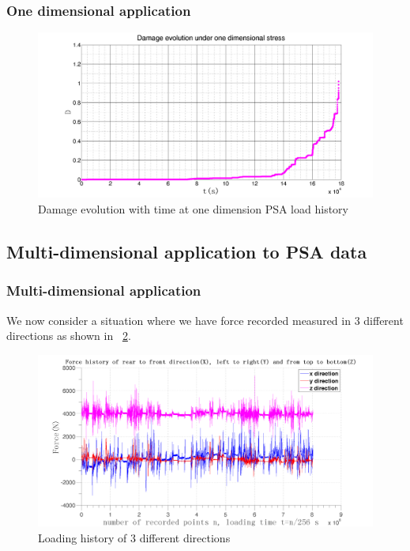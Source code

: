 \documentclass[xcolor=table]{Bredelebeamer}
\newcommand{\figref}[1]{\figurename~\ref{#1}}
\begin{document}
\begin{frame}
	\frametitle{One dimensional application}
\begin{figure}[!h]
	\centering
	\includegraphics[width=\textwidth]{figures//damage1d.png} 
	\caption{Damage evolution with time at one dimension PSA load history}
	\label{damage1d}
\end{figure}
\end{frame}	



 \subsection{Multi-dimensional application to PSA data}
\begin{frame}
	\frametitle{Multi-dimensional application}
 We now consider a situation where we have force recorded measured in 3 different directions as shown in \figref{xyz}.
 \begin{figure}[!h]
 	\centering
 	\includegraphics[width=\textwidth]{figures//xyz.png} 
 	\caption{Loading history of 3 different directions}
 	\label{xyz}
 \end{figure}
\end{frame}	
\end{document}
